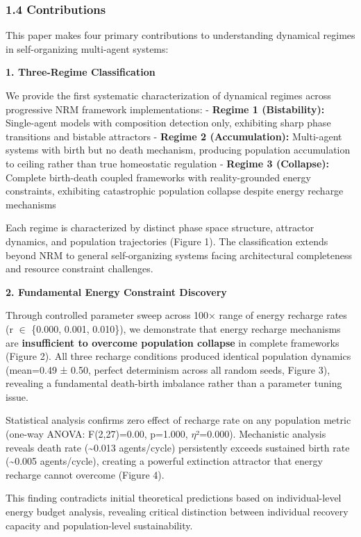 \documentclass[
]{article}
\begin{document}
\subsubsection{1.4 Contributions}\label{contributions}

This paper makes four primary contributions to understanding dynamical
regimes in self-organizing multi-agent systems:

\textbf{1. Three-Regime Classification}

We provide the first systematic characterization of dynamical regimes
across progressive NRM framework implementations: - \textbf{Regime 1
(Bistability):} Single-agent models with composition detection only,
exhibiting sharp phase transitions and bistable attractors -
\textbf{Regime 2 (Accumulation):} Multi-agent systems with birth but no
death mechanism, producing population accumulation to ceiling rather
than true homeostatic regulation - \textbf{Regime 3 (Collapse):}
Complete birth-death coupled frameworks with reality-grounded energy
constraints, exhibiting catastrophic population collapse despite energy
recharge mechanisms

Each regime is characterized by distinct phase space structure,
attractor dynamics, and population trajectories (Figure 1). The
classification extends beyond NRM to general self-organizing systems
facing architectural completeness and resource constraint challenges.

\textbf{2. Fundamental Energy Constraint Discovery}

Through controlled parameter sweep across 100× range of energy recharge
rates (r $\in$ \{0.000, 0.001, 0.010\}), we demonstrate that energy recharge
mechanisms are \textbf{insufficient to overcome population collapse} in
complete frameworks (Figure 2). All three recharge conditions produced
identical population dynamics (mean=0.49 ± 0.50, perfect determinism
across all random seeds, Figure 3), revealing a fundamental death-birth
imbalance rather than a parameter tuning issue.

Statistical analysis confirms zero effect of recharge rate on any
population metric (one-way ANOVA: F(2,27)=0.00, p=1.000, $\eta$²=0.000).
Mechanistic analysis reveals death rate (\textasciitilde0.013
agents/cycle) persistently exceeds sustained birth rate
(\textasciitilde0.005 agents/cycle), creating a powerful extinction
attractor that energy recharge cannot overcome (Figure 4).

This finding contradicts initial theoretical predictions based on
individual-level energy budget analysis, revealing critical distinction
between individual recovery capacity and population-level
sustainability.
\end{document}
